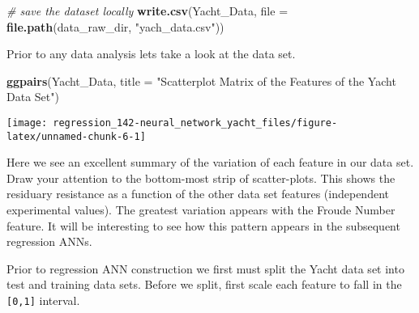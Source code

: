 \documentclass[]{book}
\newenvironment{Shaded}{\begin{snugshade}}{\end{snugshade}}
\newcommand{\CommentTok}[1]{\textcolor[rgb]{0.56,0.35,0.01}{\textit{#1}}}
\newcommand{\ControlFlowTok}[1]{\textcolor[rgb]{0.13,0.29,0.53}{\textbf{#1}}}
\newcommand{\DataTypeTok}[1]{\textcolor[rgb]{0.13,0.29,0.53}{#1}}
\newcommand{\DecValTok}[1]{\textcolor[rgb]{0.00,0.00,0.81}{#1}}
\newcommand{\FloatTok}[1]{\textcolor[rgb]{0.00,0.00,0.81}{#1}}
\newcommand{\KeywordTok}[1]{\textcolor[rgb]{0.13,0.29,0.53}{\textbf{#1}}}
\newcommand{\NormalTok}[1]{#1}
\newcommand{\OperatorTok}[1]{\textcolor[rgb]{0.81,0.36,0.00}{\textbf{#1}}}
\newcommand{\OtherTok}[1]{\textcolor[rgb]{0.56,0.35,0.01}{#1}}
\newcommand{\StringTok}[1]{\textcolor[rgb]{0.31,0.60,0.02}{#1}}
\begin{document}
\begin{Shaded}
\begin{Highlighting}[]
\CommentTok{# save the dataset locally}
\KeywordTok{write.csv}\NormalTok{(Yacht_Data, }\DataTypeTok{file =} \KeywordTok{file.path}\NormalTok{(data_raw_dir, }\StringTok{"yach_data.csv"}\NormalTok{))}
\end{Highlighting}
\end{Shaded}

Prior to any data analysis lets take a look at the data set.

\begin{Shaded}
\begin{Highlighting}[]
\KeywordTok{ggpairs}\NormalTok{(Yacht_Data, }\DataTypeTok{title =} \StringTok{"Scatterplot Matrix of the Features of the Yacht Data Set"}\NormalTok{)}
\end{Highlighting}
\end{Shaded}

\begin{center}\texttt{[image: regression\_142-neural\_network\_yacht\_files/figure-latex/unnamed-chunk-6-1]} \end{center}

Here we see an excellent summary of the variation of each feature in our data set. Draw your attention to the bottom-most strip of scatter-plots. This shows the residuary resistance as a function of the other data set features (independent experimental values). The greatest variation appears with the Froude Number feature. It will be interesting to see how this pattern appears in the subsequent regression ANNs.

Prior to regression ANN construction we first must split the Yacht data set into test and training data sets. Before we split, first scale each feature to fall in the
\texttt{{[}0,1{]}} interval.

\begin{Shaded}
\end{Shaded}
\end{document}
